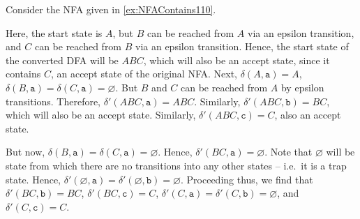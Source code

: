 \begin{Example}
Consider the NFA given in \cref{ex:NFAContains110}.
\begin{center}
\end{center}
Here, the start state is $A$, but $B$ can be reached from $A$ via an epsilon transition, and $C$ can be reached from $B$ via an epsilon transition. Hence, the start state of the converted DFA will be $ABC$, which will also be an accept state, since it contains $C$, an accept state of the original NFA. Next, $\delta(A, \texttt a) = A$, $\delta(B, \texttt a) = \delta(C, \texttt a) = \varnothing$. But $B$ and $C$ can be reached from $A$ by epsilon transitions. Therefore, $\delta'(ABC, \texttt a) = ABC$. Similarly, $\delta'(ABC, \texttt b) = BC$, which will also be an accept state. Similarly, $\delta'(ABC, \texttt c) = C$, also an accept state.
\begin{center}
\end{center}
But now, $\delta(B, \texttt a) = \delta(C, \texttt a) = \varnothing$. Hence, $\delta'(BC, \texttt a) = \varnothing$. Note that $\varnothing$ will be state from which there are no transitions into any other states -- i.e.\ it is a trap state. Hence, $\delta'(\varnothing, \texttt a) = \delta'(\varnothing, \texttt b) = \varnothing$. Proceeding thus, we find that $\delta'(BC, \texttt b) = BC$, $\delta'(BC, \texttt c) = C$, $\delta'(C, \texttt a) = \delta'(C, \texttt b) = \varnothing$, and $\delta'(C, \texttt c) = C$.

\end{Example}
